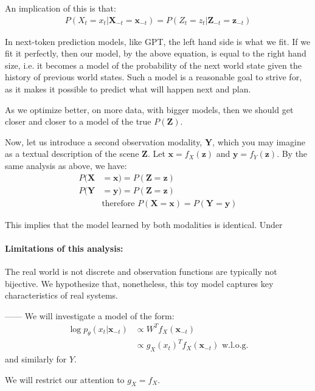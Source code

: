 \documentclass{article}
\theoremstyle{plain}
\theoremstyle{definition}
\theoremstyle{remark}
\begin{document}
An implication of this is that:
\begin{align}
    P(X_t = x_t | \mathbf{X}_{-t} = \mathbf{x}_{-t}) = P(Z_t = z_t | \mathbf{Z}_{-t} = \mathbf{z}_{-t}) 
\end{align}

In next-token prediction models, like GPT, the left hand side is what we fit. If we fit it perfectly, then our model, by the above equation, is equal to the right hand size, i.e. it becomes a model of the probability of the next world state given the history of previous world states. Such a model is a reasonable goal to strive for, as it makes it possible to predict what will happen next and plan.

As we optimize better, on more data, with bigger models, then we should get closer and closer to a model of the true $P(\mathbf{Z})$.

Now, let us introduce a second observation modality, $\mathbf{Y}$, which you may imagine as a textual description of the scene $\mathbf{Z}$. Let $\mathbf{x} = f_X(\mathbf{z})$ and $\mathbf{y} = f_Y(\mathbf{z})$. By the same analysis as above, we have:
\begin{align}
    P(\mathbf{X} &= \mathbf{x}) = P(\mathbf{Z} = \mathbf{z})\\
    P(\mathbf{Y} &= \mathbf{y}) = P(\mathbf{Z} = \mathbf{z})\\
    &\text{therefore } P(\mathbf{X} = \mathbf{x}) = P(\mathbf{Y} = \mathbf{y})
\end{align}

This implies that the model learned by both modalities is identical. Under

\paragraph{Limitations of this analysis:} The real world is not discrete and observation functions are typically not bijective. We hypothesize that, nonetheless, this toy model captures key characteristics of real systems.

------
We will investigate a model of the form:
\begin{align}
    \log p_{\theta}(x_t | \mathbf{x}_{-t}) &\propto W^Tf_X(\mathbf{x}_{-t})\\
    &\propto g_X(x_t)^Tf_X(\mathbf{x}_{-t}) \text{ w.l.o.g.}
\end{align}
and similarly for $Y$.

We will restrict our attention to $g_X=f_X$.
\end{document}
